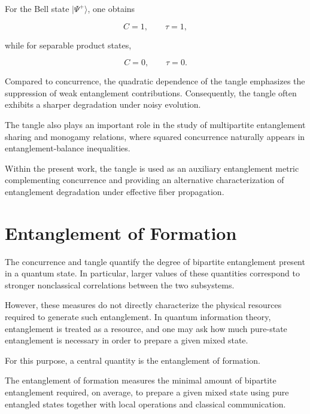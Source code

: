 \medskip

For the Bell state \( |\Psi^+\rangle \), one obtains

\[
C
=
1,
\qquad
\tau
=
1,
\]

while for separable product states,

\[
C
=
0,
\qquad
\tau
=
0.
\]

\medskip

Compared to concurrence, the quadratic dependence of the tangle emphasizes the suppression of weak entanglement contributions. Consequently, the tangle often exhibits a sharper degradation under noisy evolution.

\medskip

The tangle also plays an important role in the study of multipartite entanglement sharing and monogamy relations, where squared concurrence naturally appears in entanglement-balance inequalities.

\medskip

Within the present work, the tangle is used as an auxiliary entanglement metric complementing concurrence and providing an alternative characterization of entanglement degradation under effective fiber propagation.


\section{Entanglement of Formation}

The concurrence and tangle quantify the degree of bipartite entanglement present in a quantum state. In particular, larger values of these quantities correspond to stronger nonclassical correlations between the two subsystems.

\medskip

However, these measures do not directly characterize the physical resources required to generate such entanglement. In quantum information theory, entanglement is treated as a resource, and one may ask how much pure-state entanglement is necessary in order to prepare a given mixed state.

\medskip

For this purpose, a central quantity is the entanglement of formation.

\medskip

The entanglement of formation measures the minimal amount of bipartite entanglement required, on average, to prepare a given mixed state using pure entangled states together with local operations and classical communication.

